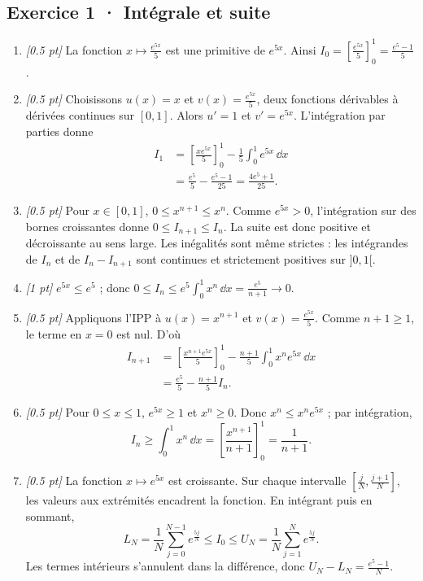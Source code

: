 \subsection*{Exercice 1 · Intégrale et suite}\begin{enumerate}

\item \textit{[\num{0,5} pt]} La fonction $x\mapsto \frac{e^{5x}}{5}$ est une primitive de $e^{5x}$. Ainsi $I_0=[\frac{e^{5x}}{5}]_0^1=\frac{e^{5}-1}{5}$.

\item \textit{[\num{0,5} pt]} Choisissons $u(x)=x$ et $v(x)=\frac{e^{5x}}{5}$, deux fonctions dérivables à dérivées continues sur $[0,1]$. Alors $u'=1$ et $v'=e^{5x}$. L'intégration par parties donne
\[\begin{aligned}I_1&=\left[\frac{xe^{5x}}{5}\right]_0^1-\frac{1}{5}\int_0^1e^{5x}\,\dd x\\&=\frac{e^{5}}{5}-\frac{e^{5}-1}{25}=\frac{4e^{5}+1}{25}.\end{aligned}\]

\item \textit{[\num{0,5} pt]} Pour $x\in[0,1]$, $0\le x^{n+1}\le x^n$. Comme $e^{5x}>0$, l'intégration sur des bornes croissantes donne $0\le I_{n+1}\le I_n$. La suite est donc positive et décroissante au sens large. Les inégalités sont même strictes : les intégrandes de $I_n$ et de $I_n-I_{n+1}$ sont continues et strictement positives sur $]0,1[$.

\item \textit{[1 pt]} $e^{5x}\le e^{5}$ ; donc $0\le I_n\le e^{5}\int_0^1x^n\,\dd x=\frac{e^{5}}{n+1}\to0$.

\item \textit{[\num{0,5} pt]} Appliquons l'IPP à $u(x)=x^{n+1}$ et $v(x)=\frac{e^{5x}}{5}$. Comme $n+1\ge1$, le terme en $x=0$ est nul. D'où
\[\begin{aligned}I_{n+1}&=\left[\frac{x^{n+1}e^{5x}}{5}\right]_0^1-\frac{n+1}{5}\int_0^1x^ne^{5x}\,\dd x\\&=\frac{e^{5}}{5}-\frac{n+1}{5}I_n.\end{aligned}\]

\item \textit{[\num{0,5} pt]} Pour $0\le x\le1$, $e^{5x}\ge1$ et $x^n\ge0$. Donc $x^n\le x^ne^{5x}$ ; par intégration,
\[I_n\ge\int_0^1x^n\,\dd x=\left[\frac{x^{n+1}}{n+1}\right]_0^1=\frac{1}{n+1}.\]

\item \textit{[\num{0,5} pt]} La fonction $x\mapsto e^{5x}$ est croissante. Sur chaque intervalle $[\frac{j}{N},\frac{j+1}{N}]$, les valeurs aux extrémités encadrent la fonction. En intégrant puis en sommant,
\[L_N=\frac{1}{N}\sum_{j=0}^{N-1}e^{\frac{5j}{N}}\le I_0\le U_N=\frac{1}{N}\sum_{j=1}^Ne^{\frac{5j}{N}}.\]
Les termes intérieurs s'annulent dans la différence, donc $U_N-L_N=\frac{e^{5}-1}{N}$.


\end{enumerate}
